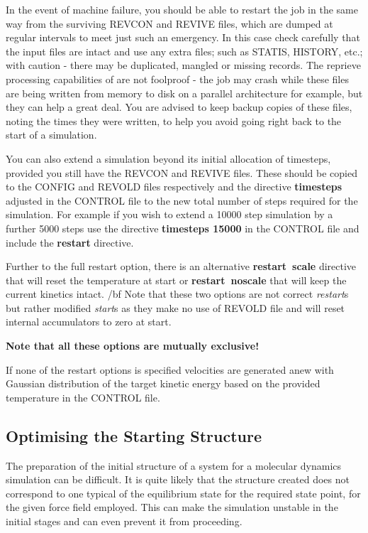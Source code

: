 In the event of machine failure, you should be able to restart the
job in the same way from the surviving REVCON and REVIVE files,
which are dumped at regular intervals to meet just such an
emergency.  In this case check carefully that the input files are
intact and use any extra files; such as STATIS, HISTORY, etc.; with
caution - there may be duplicated, mangled or missing records.
The reprieve processing capabilities of \D are not foolproof -
the job may crash while these files are being written from memory
to disk on a parallel architecture for example, but they can help
a great deal.  You are advised to keep backup copies of these files,
noting the times they were written, to help you avoid going right
back to the start of a simulation.

You can also extend a simulation beyond its initial allocation of
timesteps, provided you still have the REVCON and REVIVE files.
These should be copied to the CONFIG and REVOLD files respectively
and the directive {\bf timesteps} adjusted in the CONTROL file to
the new total number of steps required for the simulation.  For
example if you wish to extend a 10000 step simulation by a further
5000 steps use the directive {\bf timesteps 15000} in the CONTROL
file and include the {\bf restart} directive.

Further to the full restart option, there is an alternative
{\bf restart~scale} directive that will reset the temperature
at start or {\bf restart~noscale} that will keep the current
kinetics intact. {/bf Note} that these two options are not
correct {\em restart}s but rather modified {\em start}s as
they make no use of REVOLD file and will reset internal
accumulators to zero at start.

{\bf Note that all these options are mutually exclusive!}

If none of the restart options is specified velocities are
generated anew with Gaussian distribution of the target kinetic
energy based on the provided temperature in the CONTROL file.

\subsection{Optimising the Starting Structure} \label{minimisation} 

The preparation of the initial structure of a system for a molecular
dynamics simulation can be difficult.  It is quite likely that the
structure created does not correspond to one typical of the
equilibrium state for the required state point, for the given force
field employed.  This can make the simulation unstable in the initial
stages and can even prevent it from proceeding.

